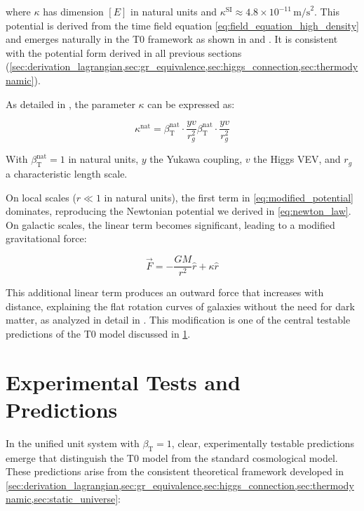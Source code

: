 \documentclass[12pt,a4paper]{article}
\newcommand{\betaT}{\beta_{\text{T}}}
\begin{document}
	where \(\kappa\) has dimension \([E]\) in natural units and \(\kappa^{\text{SI}} \approx 4.8 \times 10^{-11} \, \text{m/s}^2\). This potential is derived from the time field equation \cref{eq:field_equation_high_density} and emerges naturally in the T0 framework as shown in \cite{pascher_params_2025} and \cite{pascher_galaxies_2025}. It is consistent with the potential form derived in all previous sections (\cref{sec:derivation_lagrangian,sec:gr_equivalence,sec:higgs_connection,sec:thermodynamic}).
	
	As detailed in \cite{pascher_params_2025}, the parameter \(\kappa\) can be expressed as:
	
	\begin{equation}
		\label{eq:kappa_betaT}
		\kappa^{\text{nat}} = \betaT^{\text{nat}} \cdot \frac{yv}{r_g^2}\betaT^{\text{nat}} \cdot \frac{yv}{r_g^2}
	\end{equation}
	
	With \(\betaT^{\text{nat}} = 1\) in natural units, \(y\) the Yukawa coupling, \(v\) the Higgs VEV, and \(r_g\) a characteristic length scale.
	
	On local scales (\(r \ll 1\) in natural units), the first term in \cref{eq:modified_potential} dominates, reproducing the Newtonian potential we derived in \cref{eq:newton_law}. On galactic scales, the linear term becomes significant, leading to a modified gravitational force:
	
	\begin{equation}
		\label{eq:modified_force}
		\vec{F} = -\frac{GM}{r^2} \hat{r} + \kappa\hat{r}
	\end{equation}
	
	This additional linear term produces an outward force that increases with distance, explaining the flat rotation curves of galaxies without the need for dark matter, as analyzed in detail in \cite{pascher_galaxies_2025}. This modification is one of the central testable predictions of the T0 model discussed in \cref{sec:experiments}.
	
	\section{Experimental Tests and Predictions}
	\label{sec:experiments}
	In the unified unit system with \(\betaT = 1\), clear, experimentally testable predictions emerge that distinguish the T0 model from the standard cosmological model. These predictions arise from the consistent theoretical framework developed in \cref{sec:derivation_lagrangian,sec:gr_equivalence,sec:higgs_connection,sec:thermodynamic,sec:static_universe}:
	
\end{document}
